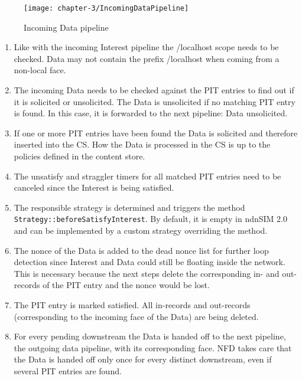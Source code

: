 \clearpage

\vspace{5mm} %

\begin{figure}[H]
  \centering
  \texttt{[image: chapter-3/IncomingDataPipeline]}
  \caption{Incoming Data pipeline \cite{Afanasyev16}}
  \label{fig:IncomingDataPipeline}
\end{figure}

\vspace{5mm} %

\begin{enumerate}
\item Like with the incoming Interest pipeline the /localhost scope needs to be checked. Data may not contain the prefix /localhost when coming from a non-local face.
\item The incoming Data needs to be checked against the PIT entries to find out if it is solicited or unsolicited. The Data is unsolicited if no matching PIT entry is found. In this case, it is forwarded to the next pipeline: Data unsolicited.
\item If one or more PIT entries have been found the Data is solicited and therefore inserted into the CS. How the Data is processed in the CS is up to the policies defined in the content store.
\item The unsatisfy and straggler timers for all matched PIT entries need to be canceled since the Interest is being satisfied.
\item The responsible strategy is determined and triggers the method \texttt{Strategy::beforeSatisfyInterest}. By default, it is empty in ndnSIM 2.0 and can be implemented by a custom strategy overriding the method.
\item The nonce of the Data is added to the dead nonce list for further loop detection since Interest and Data could still be floating inside the network. This is necessary because the next steps delete the corresponding in- and out-records of the PIT entry and the nonce would be lost. 
\item The PIT entry is marked satisfied. All in-records and out-records (corresponding to the incoming face of the Data) are being deleted.
\item For every pending downstream the Data is handed off to the next pipeline, the outgoing data pipeline, with its corresponding face. NFD takes care that the Data is handed off only once for every distinct downstream, even if several PIT entries are found.
\end{enumerate}

